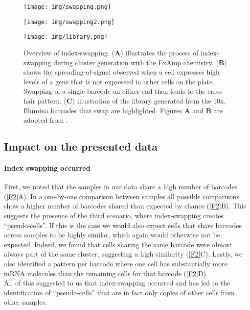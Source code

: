 \documentclass{article}
\begin{document}
\begin{figure}
\begin{minipage}[c][13cm][t]{.5\textwidth}
  \vspace*{\fill}
  \centering
  \texttt{[image: img/swapping.png]}
  \subcaption{}
\end{minipage}%
\begin{minipage}[c][11cm][t]{.5\textwidth}
  \vspace*{\fill}
  \centering
  \texttt{[image: img/swapping2.png]}
  \subcaption{}
  \par\vfill
  \texttt{[image: img/library.png]}
  \subcaption{}
\end{minipage}
\caption{Overview of index-swapping.
    (\textbf{A}) illustrates the process of index-swapping during cluster generation with the ExAmp chemistry.
    (\textbf{B}) shows the spreading-of-signal observed when a cell expresses high levels of a gene that is not expressed in other cells on the plate.
    Swapping of a single barcode on either end then leads to the cross-hair pattern.
    (\textbf{C}) illustration of the library generated from the 10x, Illumina barcodes that swap are highlighted. 
    Figures \textbf{A} and \textbf{B} are adopted from \autocite{Sinha2017}.
}
\label{F1}
\end{figure}

\subsection*{Impact on the presented data}
\paragraph{Index swapping occurred}
First, we noted that the samples in our data share a high number of barcodes (\autoref{F2}A).
In a one-by-one comparison between samples all possible comparisons show a higher number of barcodes shared than expected by chance (\autoref{F2}B).
This suggests the presence of the third scenario, where index-swapping creates ``pseudo-cells''.
If this is the case we would also expect cells that share barcodes across samples to be highly similar, which again would otherwise not be expected.
Indeed, we found that cells sharing the same barcode were almost always part of the same cluster, suggesting a high similarity (\autoref{F2}C).
Lastly, we also identified a pattern per barcode where one cell has substantially more mRNA molecules than the remaining cells for that barcode (\autoref{F2}D). \\
All of this suggested to us that index-swapping occurred and has led to the identification of ``pseudo-cells'' that are in fact only copies of other cells from other samples.\\
\end{document}
